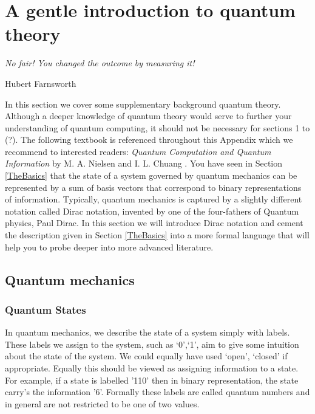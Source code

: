 \chapter{A gentle introduction to quantum theory}
\label{Advancedtopics}

\epigraph{\textit{No fair! You changed the outcome by measuring it!}}{Hubert Farnsworth}

In this section we cover some supplementary background quantum theory. Although a deeper knowledge of quantum theory would serve to further your understanding of quantum computing, it should not be necessary for sections 1 to (?). The following textbook is referenced throughout this Appendix which we recommend to interested readers: \textit{Quantum Computation and Quantum Information} by M. A. Nielsen and I. L. Chuang \cite{nielsen_chuang_2010}. You have seen in Section \ref{TheBasics} that the state of a system governed by quantum mechanics can be represented by a sum of basis vectors that correspond to binary representations of information. Typically, quantum mechanics is captured by a slightly different notation called Dirac notation, invented by one of the four-fathers of Quantum physics, Paul Dirac. In this section we will introduce Dirac notation and cement the description given in Section \ref{TheBasics} into a more formal language that will help you to probe deeper into more advanced literature.

\section{Quantum mechanics}

\subsection{Quantum States}

In quantum mechanics, we describe the state of a system simply with labels. These labels we assign to the system, such as {`0',`1'}, aim to give some intuition about the state of the system. We could equally have used {`open', `closed'} if appropriate. Equally this should be viewed as assigning information to a state. For example, if a state is labelled '110' then in binary representation, the state carry's the information '6'. Formally these labels are called quantum numbers and in general are not restricted to be one of two values.\\

